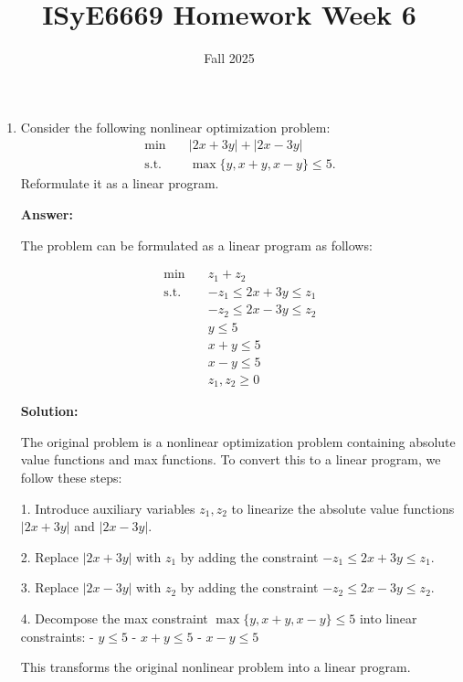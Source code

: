 \documentclass[11pt]{article}
\title{ISyE6669 Homework Week 6}
\author{}
\date{Fall 2025}
\begin{document}
\maketitle

\begin{enumerate}

\item Consider the following nonlinear optimization problem:
\begin{align*}
    \min \quad & |2x+3y| + |2x-3y| \\
    \text{s.t.}\quad & \max\{y,x+y,x-y\}\le 5.
\end{align*}
Reformulate it as a linear program.

\textbf{Answer:}

The problem can be formulated as a linear program as follows:

\begin{align*}
\min \quad & z_1 + z_2 \\
\text{s.t.} \quad & -z_1 \leq 2x + 3y \leq z_1 \\
& -z_2 \leq 2x - 3y \leq z_2 \\
& y \leq 5 \\
& x + y \leq 5 \\
& x - y \leq 5 \\
& z_1, z_2 \geq 0
\end{align*}

\textbf{Solution:}

The original problem is a nonlinear optimization problem containing absolute value functions and max functions. To convert this to a linear program, we follow these steps:

1. Introduce auxiliary variables $z_1, z_2$ to linearize the absolute value functions $|2x+3y|$ and $|2x-3y|$.

2. Replace $|2x+3y|$ with $z_1$ by adding the constraint $-z_1 \leq 2x + 3y \leq z_1$.

3. Replace $|2x-3y|$ with $z_2$ by adding the constraint $-z_2 \leq 2x - 3y \leq z_2$.

4. Decompose the max constraint $\max\{y, x+y, x-y\} \leq 5$ into linear constraints:
   - $y \leq 5$
   - $x + y \leq 5$ 
   - $x - y \leq 5$

This transforms the original nonlinear problem into a linear program.


\end{enumerate}
\end{document}
